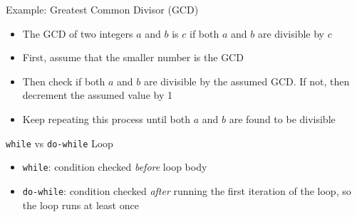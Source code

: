 \documentclass[12pt, aspectratio=169]{beamer}
\begin{document}
    \begin{frame}{Example: Greatest Common Divisor (GCD)}
        \begin{itemize}
            \item The GCD of two integers $a$ and $b$ is $c$ if both $a$ and $b$ are divisible by $c$
            \item First, assume that the smaller number is the GCD
            \item Then check if both $a$ and $b$ are divisible by the assumed GCD. If not, then decrement the assumed value by 1
            \item Keep repeating this process until both $a$ and $b$ are found to be divisible
        \end{itemize}
    \end{frame}








    \begin{frame}{\texttt{while} vs \texttt{do-while} Loop}
        \begin{itemize}
            \item \texttt{while}: condition checked \textit{before} loop body
            \item \texttt{do-while}: condition checked \textit{after} running the first iteration of the loop, so the loop runs at least once
        \end{itemize}
    \end{frame}
\end{document}
